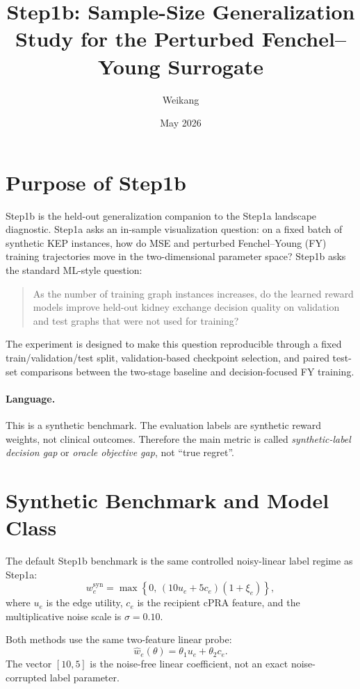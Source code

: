 \documentclass[11pt]{article}
\title{Step1b: Sample-Size Generalization Study for the Perturbed Fenchel--Young Surrogate}
\author{Weikang}
\date{May 2026}
\begin{document}
\maketitle

\section{Purpose of Step1b}

Step1b is the held-out generalization companion to the Step1a landscape
diagnostic. Step1a asks an in-sample visualization question: on a fixed batch of
synthetic KEP instances, how do MSE and perturbed Fenchel--Young (FY) training
trajectories move in the two-dimensional parameter space? Step1b asks the
standard ML-style question:

\begin{quote}
As the number of training graph instances increases, do the learned reward
models improve held-out kidney exchange decision quality on validation and test
graphs that were not used for training?
\end{quote}

The experiment is designed to make this question reproducible through a fixed
train/validation/test split, validation-based checkpoint selection, and paired
test-set comparisons between the two-stage baseline and decision-focused FY
training.

\paragraph{Language.}
This is a synthetic benchmark. The evaluation labels are synthetic reward
weights, not clinical outcomes. Therefore the main metric is called
\emph{synthetic-label decision gap} or \emph{oracle objective gap}, not ``true
regret''.

\section{Synthetic Benchmark and Model Class}

The default Step1b benchmark is the same controlled noisy-linear label regime as
Step1a:
\[
    w^{\mathrm{syn}}_e
    =
    \max\left\{0,\,
    (10u_e + 5c_e)(1+\xi_e)
    \right\},
\]
where \(u_e\) is the edge utility, \(c_e\) is the recipient cPRA feature, and
the multiplicative noise scale is \(\sigma=0.10\).

Both methods use the same two-feature linear probe:
\[
    \hat w_e(\theta)
    =
    \theta_1 u_e + \theta_2 c_e.
\]
The vector \([10,5]\) is the noise-free linear coefficient, not an exact
noise-corrupted label parameter.
\end{document}
